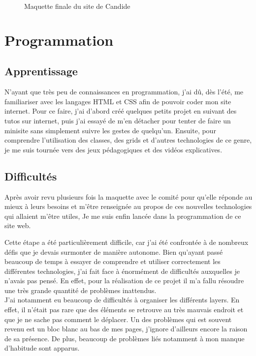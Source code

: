 \documentclass[a4,10pt,french]{sphinxmanual}
\begin{document}
\begin{figure}[htbp]
\centering
\capstart

\noindent{}
\caption{Maquette finale du site de Candide}\label{\detokenize{chapitre-02:id4}}\end{figure}


\chapter{Programmation}
\label{\detokenize{chapitre-03:programmation}}\label{\detokenize{chapitre-03::doc}}

\section{Apprentissage}
\label{\detokenize{chapitre-03:apprentissage}}
\sphinxAtStartPar
N’ayant que très peu de connaissances en programmation, j’ai dû, dès l’été, me familiariser avec les langages HTML et CSS afin de pouvoir coder mon site internet. Pour ce faire, j’ai d’abord créé quelques petits projet en suivant des tutos sur internet, puis j’ai essayé de m’en détacher pour tenter de faire un mini\sphinxhyphen{}site sans simplement suivre les gestes de quelqu’un. Ensuite, pour comprendre l’utilisation des classes, des grids et d’autres technologies de ce genre, je me suis tournée vers des jeux pédagogiques et des vidéos explicatives.


\section{Difficultés}
\label{\detokenize{chapitre-03:difficultes}}
\sphinxAtStartPar
Après avoir revu plusieurs fois la maquette avec le comité pour qu’elle réponde au mieux à leurs besoins et m’être renseignée au propos de ces nouvelles technologies qui allaient m’être utiles, Je me suis enfin lancée dans la programmation de ce site web.

\sphinxAtStartPar
Cette étape a été particulièrement difficile, car j’ai été confrontée à de nombreux défis que je devais surmonter de manière autonome. Bien qu’ayant passé beaucoup de temps à essayer de comprendre et utiliser correctement les différentes technologies, j’ai fait face à énormément de difficultés auxquelles je n’avais pas pensé. En effet, pour la réalisation de ce projet il m’a fallu résoudre une très grande quantité de problèmes inattendus.\\
J’ai notamment eu beaucoup de difficultés à organiser les différents layers. En effet, il n’était pas rare que des éléments se retrouve au très mauvais endroit et que je ne sache pas comment le déplacer. Un des problèmes qui est souvent revenu est un bloc blanc au bas de mes pages, j’ignore d’ailleurs encore la raison de sa présence. De plus, beaucoup de problèmes liés notamment à mon manque d’habitude sont apparus.
\end{document}
